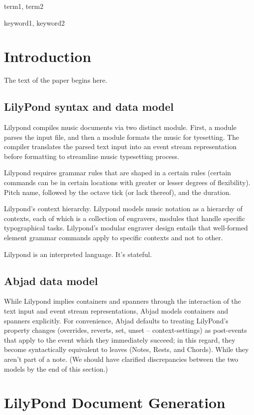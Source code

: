 \documentclass{sigplanconf}
\begin{document}
\terms
term1, term2

\keywords
keyword1, keyword2

\section{Introduction}

The text of the paper begins here.

\subsection{LilyPond syntax and data model}
Lilypond compiles music documents via two distinct module. First, a module parses the input
file, and then a module formats the music for tyesetting. The compiler translates the parsed text input into an event stream representation before formatting to streamline music typesetting process.\cite{sandberg2006separating}

Lilypond requires grammar rules that are shaped in a certain rules (certain commands can be in certain locations with greater or lesser degrees of flexibility). Pitch name, followed by the octave tick (or lack thereof), and the duration. 

Lilypond's context hierarchy. Lilypond models music notation as a hierarchy of contexts, each of which is a collection of engravers, modules that handle specific typographical tasks. Lilypond's modular engraver design entails that well-formed element grammar commands apply to specific contexts and not to other.

Lilypond is an interpreted language. It's stateful.

\subsection{Abjad data model}
While Lilypond implies containers and spanners through the interaction of the text input and event stream representations, Abjad models containers and spanners explicitly. For convenience, Abjad defaults to treating LilyPond's property changes (overrides, reverts, set, unset -- context-settings) as post-events that apply to the event which they immediately succeed; in this regard, they become syntactically equivalent to leaves (Notes, Rests, and Chords). While they aren't part of a note. (We should have clarified discrepancies between the two models by the end of this section.)

\section{LilyPond Document Generation}
\end{document}
